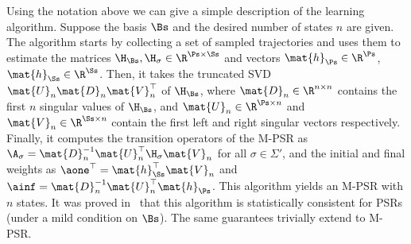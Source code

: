 Using the notation above we can give a simple description of the learning algorithm. Suppose the basis $\Bs$ and the desired number of states $n$ are given. The algorithm starts by collecting a set of sampled trajectories and uses them to estimate the matrices $\H_{\Bs}, \H_\sigma \in \R^{\Ps \times \Ss}$ and vectors $\mat{h}_{\Ps} \in \R^{\Ps}$, $\mat{h}_{\Ss} \in \R^{\Ss}$. Then, it takes the truncated SVD $\mat{U}_n \mat{D}_n \mat{V}_n^\top$ of $\H_{\Bs}$, where $\mat{D}_n \in \R^{n \times n}$ contains the first $n$ singular values of $\H_{\Bs}$, and $\mat{U}_n \in \R^{\Ps \times n}$ and $\mat{V}_n \in \R^{\Ss \times n}$ contain the first left and right singular vectors respectively. Finally, it computes the transition operators of the M-PSR as $\A_\sigma = \mat{D}_n^{-1} \mat{U}_n^\top \H_\sigma \mat{V}_n$ for all $\sigma \in \Sigma'$, and the initial and final weights as $\aone^\top = \mat{h}_{\Ss}^\top \mat{V}_n$ and $\ainf = \mat{D}_n^{-1} \mat{U}_n^\top \mat{h}_{\Ps}$.
%
This algorithm yields an M-PSR with $n$ states. It was proved in~\cite{bootspsr} that this algorithm is statistically consistent for PSRs (under a mild condition on $\Bs$). The same guarantees trivially extend to M-PSR.


